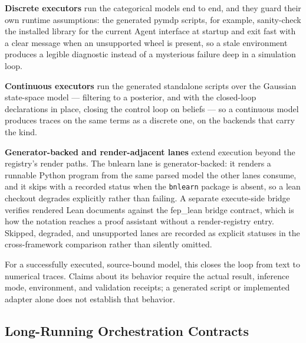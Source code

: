 \documentclass[
  english,
  9pt,
]{extarticle}
\begin{document}
\textbf{Discrete executors} run the categorical models end to end, and
they guard their own runtime assumptions: the generated pymdp scripts,
for example, sanity-check the installed library for the current Agent
interface at startup and exit fast with a clear message when an
unsupported wheel is present, so a stale environment produces a legible
diagnostic instead of a mysterious failure deep in a simulation loop.

\textbf{Continuous executors} run the generated standalone scripts over
the Gaussian state-space model --- filtering to a posterior, and with
the closed-loop declarations in place, closing the control loop on
beliefs --- so a continuous model produces traces on the same terms as a
discrete one, on the backends that carry the kind.

\textbf{Generator-backed and render-adjacent lanes} extend execution
beyond the registry's render paths. The bnlearn lane is
generator-backed: it renders a runnable Python program from the same
parsed model the other lanes consume, and it skips with a recorded
status when the \texttt{bnlearn} package is absent, so a lean checkout
degrades explicitly rather than failing. A separate execute-side bridge
verifies rendered Lean documents against the fep\_lean bridge contract,
which is how the notation reaches a proof assistant without a
render-registry entry. Skipped, degraded, and unsupported lanes are
recorded as explicit statuses in the cross-framework comparison rather
than silently omitted.

For a successfully executed, source-bound model, this closes the loop
from text to numerical traces. Claims about its behavior require the
actual result, inference mode, environment, and validation receipts; a
generated script or implemented adapter alone does not establish that
behavior.

\subsection{Long-Running Orchestration
Contracts}\label{long-running-orchestration-contracts}
\end{document}
